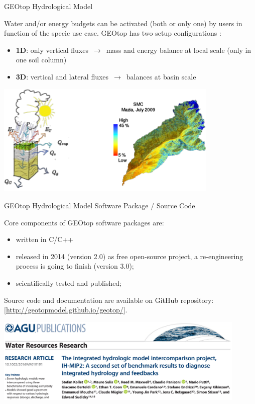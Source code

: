 \documentclass[ignorenonframetext,]{beamer}
\providecommand{\tightlist}{%
  \setlength{\itemsep}{0pt}\setlength{\parskip}{0pt}}
\begin{document}
\begin{frame}{GEOtop Hydrological Model}

Water and/or energy budgets can be activated (both or only one) by users
in function of the specic use case. GEOtop has two setup configurations
:

\begin{itemize}
\item
  \textbf{1D}: only vertical fluxes \(\,\to\,\) mass and energy balance
  at local scale (only in one soil column)
\item
  \textbf{3D}: vertical and lateral fluxes \(\,\to\,\) balances at basin
  scale
\end{itemize}

\includegraphics[width=0.80000\textwidth]{resources/images/geotop_ET_SWC.png}\\

\end{frame}

\begin{frame}{GEOtop Hydrological Model Software Package / Source Code}

Core components of GEOtop software packages are:

\begin{itemize}
\tightlist
\item
  written in C/C++
\item
  released in 2014 (version 2.0) as free open-source project, a
  re-engineering process is going to finish (version 3.0);
\item
  scientifically tested and published;
\end{itemize}

Source code and documentation are available on GitHub repository:
{[}\url{http://geotopmodel.github.io/geotop/}{]}.

\includegraphics[width=0.90000\textwidth]{resources/images/geotop_paper_2017.png}\\

\end{frame}
\end{document}
